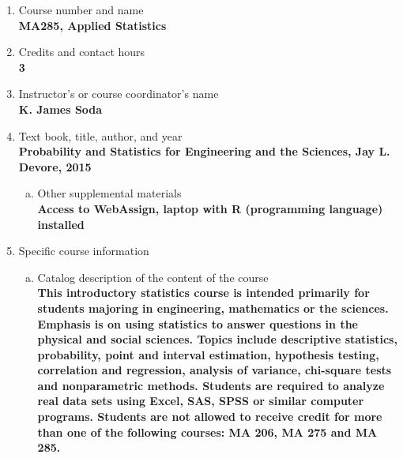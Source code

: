 \label{MA285}  %
\begin{enumerate}[1.]
\item Course number and name\\
  {\bfseries
    MA285, Applied Statistics    
  }
  
\item Credits and contact hours\\
  {\bfseries
    3  %
  }

\item Instructor's or course coordinator's name\\
  {\bfseries
    K. James Soda    
  }

\item Text book, title, author, and year\\
  {\bfseries
    Probability and Statistics for Engineering and the Sciences, Jay L. Devore, 2015
  }
\begin{enumerate}[a.]
\item Other supplemental materials\\
  {\bfseries
    Access to WebAssign, laptop with R (programming language) installed
  }
\end{enumerate}

\item Specific course information
\begin{enumerate}[a.]  
\item Catalog description of the content of the course\\
  {\bfseries
This introductory statistics course is intended primarily for students majoring in engineering, mathematics or the sciences. Emphasis is on using statistics to answer questions in the physical and social sciences. Topics include descriptive statistics, probability, point and interval estimation, hypothesis testing, correlation and regression, analysis of variance, chi-square tests and nonparametric methods. Students are required to analyze real data sets using Excel, SAS, SPSS or similar computer programs. Students are not allowed to receive credit for more than one of the following courses: MA 206, MA 275 and MA 285.    
  }


\end{enumerate}
\end{enumerate}
